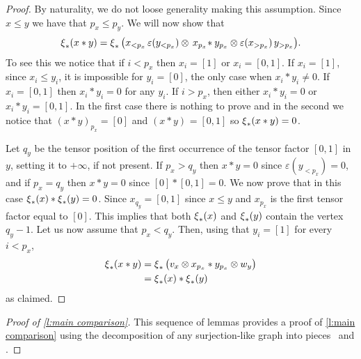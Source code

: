 \begin{proof}
	By naturality, we do not loose generality making this assumption.
	Since $x \leq y$ we have that $p_x \leq p_y$.
	We will now show that
	\[
	\operatorname{\xi}_\ast(x \ast y) = \operatorname{\xi}_\ast \big( x_{<p_x} \, \varepsilon(y_{<p_x}) \otimes \, x_{p_x} \! \ast y_{p_x} \otimes \varepsilon(x_{>p_x}) \, y_{>p_x} \big).
	\]
	To see this we notice that if $i < p_x$ then $x_i = [1]$ or $x_i = [0,1]$.
	If $x_i = [1]$, since $x_i \leq y_i$, it is impossible for $y_i = [0]$, the only case when $x_i \ast y_i \neq 0$.
	If $x_i = [0,1]$ then $x_i \ast y_i = 0$ for any $y_i$.
	If $i > p_x$, then either $x_i \ast y_i = 0$ or $x_i \ast y_i = [0,1]$.
	In the first case there is nothing to prove and in the second we notice that $(x \ast y)_{p_x} = [0]$ and $(x \ast y)_{} = [0,1]$ so $\operatorname{\xi}_\ast(x \ast y) = 0$.

	Let $q_y$ be the tensor position of the first occurrence of the tensor factor $[0,1]$ in $y$, setting it to $+\infty$, if not present.
	If $p_x > q_y$ then $x \ast y = 0$ since $\varepsilon(y_{<p_x}) = 0$, and if $p_x = q_y$ then $x \ast y = 0$ since $[0] \ast [0,1] = 0$.
	We now prove that in this case $\operatorname{\xi}_\ast(x) \ast \operatorname{\xi}_\ast(y) = 0$.
	Since $x_{q_y} = [0,1]$ since $x \leq y$ and $x_{p_x}$ is the first tensor factor equal to $[0]$.
	This implies that both $\operatorname{\xi}_\ast(x)$ and $\operatorname{\xi}_\ast(y)$ contain the vertex $q_{y} - 1$.
	Let us now assume that $p_x < q_y$.
	Then, using that $y_i = [1]$ for every $i < p_x$,
	\begin{align*}
	\operatorname{\xi}_\ast(x \ast y) & =
	\operatorname{\xi}_\ast \big( v_x \otimes x_{p_x} \ast y_{p_x} \otimes w_y \big) \\ & =
	\operatorname{\xi}_\ast(x) \ast \operatorname{\xi}_\ast(y)
	\end{align*}
	as claimed.
\end{proof}

\begin{proof}[Proof of \cref{l:main comparison}]
	This sequence of lemmas provides a proof of \cref{l:main comparison} using the decomposition of any surjection-like graph into pieces \coproduct \ and \product.
\end{proof}